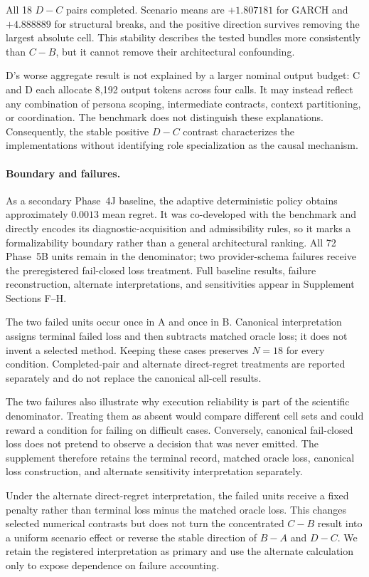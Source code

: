 All 18 \(D-C\) pairs completed.  Scenario means are \(+1.807181\) for GARCH
and \(+4.888889\) for structural breaks, and the positive direction survives
removing the largest absolute cell.  This stability describes the tested
bundles more consistently than \(C-B\), but it cannot remove their
architectural confounding.

D's worse aggregate result is not explained by a larger nominal output
budget: C and D each allocate 8,192 output tokens across four calls.  It may
instead reflect any combination of persona scoping, intermediate contracts,
context partitioning, or coordination.  The benchmark does not distinguish
these explanations.  Consequently, the stable positive \(D-C\) contrast
characterizes the implementations without identifying role specialization as
the causal mechanism.

\paragraph{Boundary and failures.}
As a secondary Phase~4J baseline, the adaptive deterministic policy obtains
approximately \(0.0013\) mean regret.  It was co-developed with the benchmark
and directly encodes its diagnostic-acquisition and admissibility rules, so it
marks a formalizability boundary rather than a general architectural ranking.
All 72 Phase~5B units remain in the denominator; two provider-schema failures
receive the preregistered fail-closed loss treatment.  Full baseline results,
failure reconstruction, alternate interpretations, and sensitivities appear
in Supplement Sections F--H.

The two failed units occur once in A and once in B.  Canonical interpretation
assigns terminal failed loss and then subtracts matched oracle loss; it does
not invent a selected method.  Keeping these cases preserves \(N=18\) for
every condition.  Completed-pair and alternate direct-regret treatments are
reported separately and do not replace the canonical all-cell results.

The two failures also illustrate why execution reliability is part of the
scientific denominator.  Treating them as absent would compare different
cell sets and could reward a condition for failing on difficult cases.
Conversely, canonical fail-closed loss does not pretend to observe a decision
that was never emitted.  The supplement therefore retains the terminal record,
matched oracle loss, canonical loss construction, and alternate sensitivity
interpretation separately.

Under the alternate direct-regret interpretation, the failed units receive a
fixed penalty rather than terminal loss minus the matched oracle loss.  This
changes selected numerical contrasts but does not turn the concentrated
\(C-B\) result into a uniform scenario effect or reverse the stable direction
of \(B-A\) and \(D-C\).  We retain the registered interpretation as primary
and use the alternate calculation only to expose dependence on failure
accounting.
